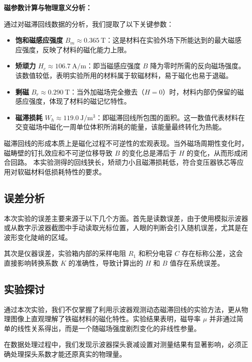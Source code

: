 \documentclass{../template/Report}%
\begin{document}
\begin{fullreportonly}
    \textbf{磁参数计算与物理意义分析：}

    通过对磁滞回线数据的分析，我们提取了以下关键参数：
    \begin{itemize}
        \item \textbf{饱和磁感应强度} $B_m \approx \SI{0.365}{\tesla}$：这是材料在实验外场下所能达到的最大磁感应强度，反映了材料的磁化能力上限。
        \item \textbf{矫顽力} $H_c \approx \SI{106.7}{\ampere\per\meter}$：即当磁感应强度 $B$ 降为零时所需的反向磁场强度。该数值较低，表明实验所用的材料属于软磁材料，易于磁化也易于退磁。
        \item \textbf{剩磁} $B_r \approx \SI{0.290}{\tesla}$：当外加磁场完全撤去（$H=0$）时，材料内部仍保留的磁感应强度，体现了材料的磁记忆特性。
        \item \textbf{磁滞损耗} $W_h \approx \SI{119.0}{\joule\per\meter\cubed}$：即磁滞回线所包围的面积。这一数值代表材料在交变磁场中磁化一周单位体积所消耗的能量，该能量最终转化为热能。
    \end{itemize}

    磁滞回线的形成本质上是磁化过程不可逆性的宏观表现。当外磁场周期性变化时，磁畴壁的钉扎效应和不可逆位移导致 $B$ 的变化总是滞后于 $H$ 的变化，从而形成闭合回路。
    本实验测得的回线狭长，矫顽力小且磁滞损耗低，符合变压器铁芯等应用对软磁材料低损耗特性的要求。

    \subsection{误差分析}

    本次实验的误差主要来源于以下几个方面。首先是读数误差，由于使用模拟示波器或从数字示波器截图中手动读取光标位置，人眼的判断会引入随机误差，尤其是在波形变化陡峭的区域。

    其次是仪器误差，实验箱内部的采样电阻 $R_1$ 和积分电容 $C$ 存在标称公差，这会直接影响转换系数 $K$ 的准确性，导致计算出的 $H$ 和 $B$ 值存在系统误差。

    \subsection{实验探讨}

    通过本次实验，我们不仅掌握了利用示波器观测动态磁滞回线的实验方法，更从物理图像上直观理解了铁磁材料的磁化特性。实验结果表明，磁导率 $\mu$ 并非通过简单的线性关系得出，而是一个随磁场强度剧烈变化的非线性参量。

    在数据处理过程中，我们发现示波器探头衰减设置对测量结果有显著影响，必须正确处理探头系数才能还原真实的物理量。


\end{fullreportonly}
\end{document}
